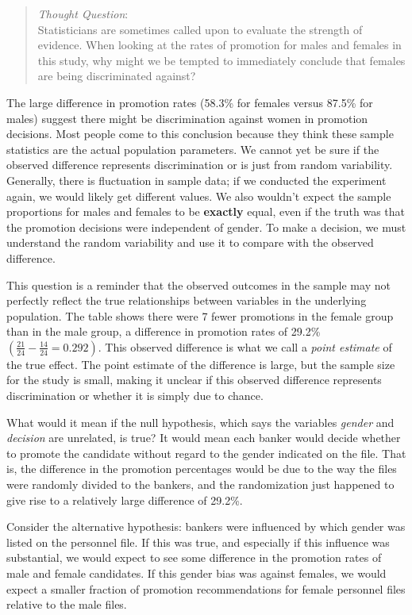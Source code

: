 \documentclass[
  letterpaper,
  DIV=11,
  numbers=noendperiod]{scrreprt}
\begin{document}
\begin{quote}
\emph{Thought Question}:\\
Statisticians are sometimes called upon to evaluate the strength of
evidence. When looking at the rates of promotion for males and females
in this study, why might we be tempted to immediately conclude that
females are being discriminated against?
\end{quote}

The large difference in promotion rates (58.3\% for females versus
87.5\% for males) suggest there might be discrimination against women in
promotion decisions. Most people come to this conclusion because they
think these sample statistics are the actual population parameters. We
cannot yet be sure if the observed difference represents discrimination
or is just from random variability. Generally, there is fluctuation in
sample data; if we conducted the experiment again, we would likely get
different values. We also wouldn't expect the sample proportions for
males and females to be \textbf{exactly} equal, even if the truth was
that the promotion decisions were independent of gender. To make a
decision, we must understand the random variability and use it to
compare with the observed difference.

This question is a reminder that the observed outcomes in the sample may
not perfectly reflect the true relationships between variables in the
underlying population. The table shows there were 7 fewer promotions in
the female group than in the male group, a difference in promotion rates
of 29.2\% \(\left( \frac{21}{24} - \frac{14}{24} = 0.292 \right)\). This
observed difference is what we call a \emph{point estimate} of the true
effect. The point estimate of the difference is large, but the sample
size for the study is small, making it unclear if this observed
difference represents discrimination or whether it is simply due to
chance.

What would it mean if the null hypothesis, which says the variables
\emph{gender} and \emph{decision} are unrelated, is true? It would mean
each banker would decide whether to promote the candidate without regard
to the gender indicated on the file. That is, the difference in the
promotion percentages would be due to the way the files were randomly
divided to the bankers, and the randomization just happened to give rise
to a relatively large difference of 29.2\%.

Consider the alternative hypothesis: bankers were influenced by which
gender was listed on the personnel file. If this was true, and
especially if this influence was substantial, we would expect to see
some difference in the promotion rates of male and female candidates. If
this gender bias was against females, we would expect a smaller fraction
of promotion recommendations for female personnel files relative to the
male files.
\end{document}

